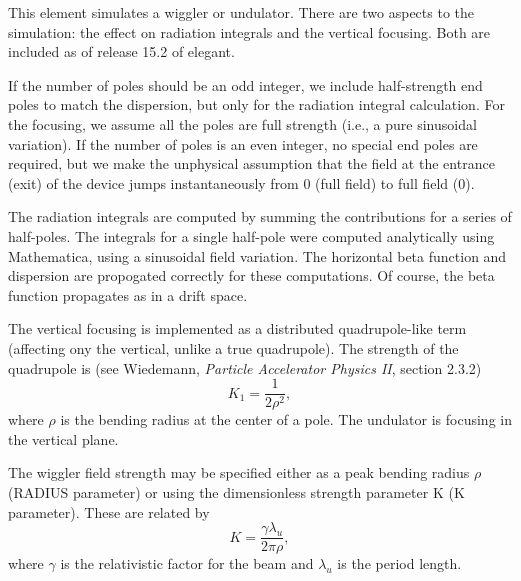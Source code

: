 This element simulates a wiggler or undulator.  There are two aspects
to the simulation: the effect on radiation integrals and the vertical
focusing.  Both are included as of release 15.2 of elegant.  

If the number of poles should be an odd integer, we include
half-strength end poles to match the dispersion, but only for the
radiation integral calculation.  For the focusing, we assume all the
poles are full strength (i.e., a pure sinusoidal variation).  If the
number of poles is an even integer, no special end poles are required,
but we make the unphysical assumption that the field at the entrance
(exit) of the device jumps instantaneously from 0 (full field) to full
field (0).

The radiation integrals are computed by summing the contributions for
a series of half-poles.  The integrals for a single half-pole were
computed analytically using Mathematica, using a sinusoidal field
variation.  The horizontal beta function and dispersion are propogated
correctly for these computations.  Of course, the beta function
propagates as in a drift space.

The vertical focusing is implemented as a distributed quadrupole-like
term (affecting ony the vertical, unlike a true quadrupole).  The
strength of the quadrupole is (see Wiedemann, {\em Particle Accelerator
Physics II}, section 2.3.2)
\begin{equation}
K_1 = \frac{1}{2\rho^2},
\end{equation}
where $\rho$ is the bending radius at the center of a pole.  The
undulator is focusing in the vertical plane.

The wiggler field strength may be specified either as a peak bending 
radius $\rho$ (RADIUS parameter) or using the dimensionless strength parameter
K (K parameter).  These are related by
\begin{equation}
K = \frac{\gamma \lambda_u}{2 \pi \rho},
\end{equation}
where $\gamma$ is the relativistic factor for the beam and $\lambda_u$ is
the period length.

